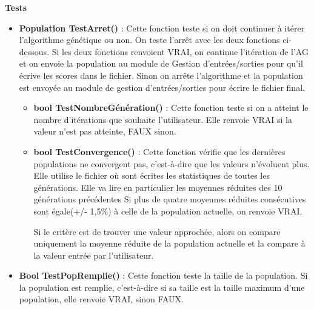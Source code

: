\documentclass[a4paper,11pt]{article}
\begin{document}
			\textbf{Tests}
				\begin{itemize}
							\item \textbf{Population TestArret()} :  Cette fonction teste si on doit continuer à itérer l’algorithme génétique ou non. 
								On teste l’arrêt avec les deux fonctions ci-dessous. 
								Si les deux fonctions renvoient VRAI, on continue l’itération de l’AG et on envoie la population au module de Gestion d’entrées/sorties pour qu’il écrive les scores dans le fichier. 
								Sinon on arrête l'algorithme et la population est envoyée au module de gestion d’entrées/sorties pour écrire le fichier final.\vspace{0.2cm}
								\begin{itemize}
								\item \textbf{bool TestNombreGénération()} : Cette fonction teste si on a atteint le nombre d’itérations que souhaite l’utilisateur.
									Elle renvoie VRAI si la valeur n’est pas atteinte, FAUX sinon.\vspace{0.2cm}
								\item \textbf{bool TestConvergence()} : Cette fonction vérifie que les dernières populations ne convergent pas, c'est-à-dire que les valeurs n'évoluent plus. %
								Elle utilise le fichier où sont écrites les statistiques de toutes les générations. Elle va lire en particulier les moyennes réduites des 10 générations précédentes
															Si plus de quatre moyennes réduites consécutives sont égale(+/- 1,5$\%$) à celle de la population actuelle, on renvoie VRAI.

															Si le critère est de trouver une valeur approchée, alors on compare uniquement la moyenne réduite de la population actuelle et la compare à la valeur entrée par l'utilisateur.\vspace{0.2cm}
								\end{itemize}
							
							\item \textbf{Bool TestPopRemplie()} : Cette fonction teste la taille de la population. Si la population est remplie, c’est-à-dire si sa taille est la taille maximum d’une population, elle renvoie VRAI, sinon FAUX.\vspace{0.2cm}
					
					\end{itemize}
				
\end{document}

